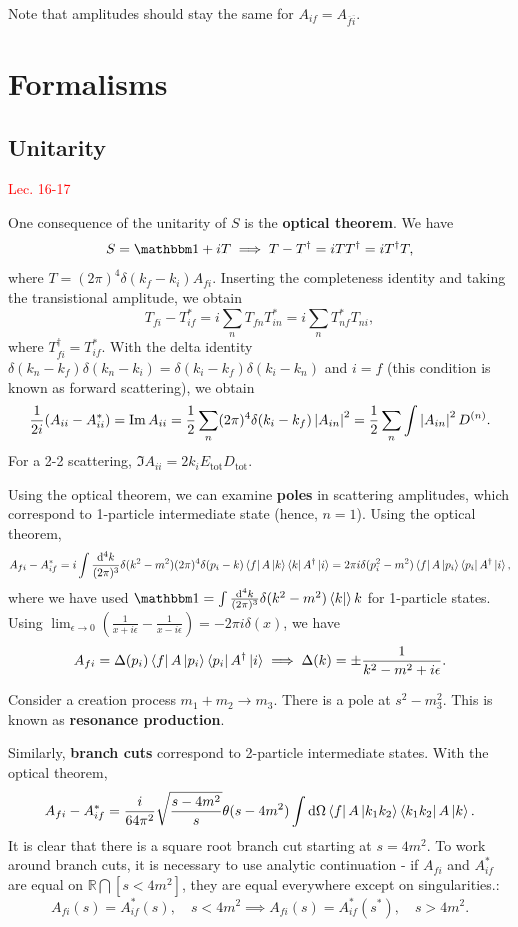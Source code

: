 \documentclass{article}
\begin{document}
Note that amplitudes should stay the same for $A_{if}=A_{\overline f\overline i}$.

\pagebreak

\section{Formalisms}

\subsection{Unitarity}
\textcolor{red}{Lec. 16-17}

One consequence of the unitarity of $S$ is the \textbf{optical theorem}. We have 
$$S=\mathbbm 1+iT\implies T-T^\dag=iTT^\dag=iT^\dag T,$$
where $T=(2\pi)^4\delta(k_f-k_i)A_{fi}.$ Inserting the completeness identity and taking the transistional amplitude, we obtain 
$$T_{fi}-T^*_{if}=i\sum_nT_{fn}T^*_{in}=i\sum_nT^*_{nf}T_{ni},$$
where $T^\dag_{fi}=T^*_{if}$. With the delta identity $\delta(k_n-k_f)\delta(k_n-k_i)=\delta(k_i-k_f)\delta(k_i-k_n)$ and $i=f$ (this condition is known as forward scattering), we obtain
\begin{equation}
    \frac 1{2i}(A_{ii}-A^*_{ii})=\Im A_{ii}=\frac 12\sum_n(2\pi)^4\delta(k_i-k_f)\left\lvert A_{in}\right\rvert^2=\frac 12\sum_n\int\left\lvert A_{in}\right\rvert^2D^{(n)}.
\end{equation}
\example For a 2-2 scattering, $\Im A_{ii}=2k_iE_\text{tot}D_\text{tot}.$

Using the optical theorem, we can examine \textbf{poles} in scattering amplitudes, which correspond to 1-particle intermediate state (hence, $n=1$). Using the optical theorem, 
\begin{align*}
    A_{fi}-A^*_{if}=i\int\frac{\dd^4k}{(2\pi)^3}\delta(k^2-m^2)(2\pi)^4\delta(p_i-k)\bra fA\ket k\bra kA^\dag\ket i=2\pi i\delta(p_i^2-m^2)\bra fA\ket{p_i}\bra{p_i}A^\dag\ket i,
\end{align*}
where we have used $\mathbbm 1=\int\frac{\dd^4k}{(2\pi)^3}\delta(k^2-m^2)\bra k\ket k$ for 1-particle states. Using $\lim_{\epsilon\to 0}\left(\frac 1{x+i\epsilon}-\frac 1{x-i\epsilon}\right)=-2\pi i\delta(x)$, we have 
$$A_{fi}=\Delta(p_i)\bra fA\ket{p_i}\bra{p_i}A^\dag\ket i\implies\Delta(k)=\pm\frac 1{k^2-m^2+i\epsilon}.$$

\example Consider a creation process $m_1+m_2\to m_3$. There is a pole at $s^2-m_3^2$. This is known as \textbf{resonance production}.

Similarly, \textbf{branch cuts} correspond to 2-particle intermediate states. With the optical theorem, 
$$A_{fi}-A^*_{if}=\frac i{64\pi^2}\sqrt{\frac{s-4m^2}s}\theta(s-4m^2)\int\dd\Omega\bra fA\ket{k_1k_2}\bra{k_1k_2}A\ket k.$$
It is clear that there is a square root branch cut starting at $s=4m^2$. To work around branch cuts, it is necessary to use analytic continuation - if $A_{fi}$ and $A^*_{if}$ are equal on $\mathbb R\bigcap [s<4m^2]$, they are equal everywhere except on singularities.:
$$A_{fi}(s)=A^*_{if}(s),\quad s<4m^2\implies A_{fi}(s)=A^*_{if}(s^*),\quad s>4m^2.$$
\end{document}
